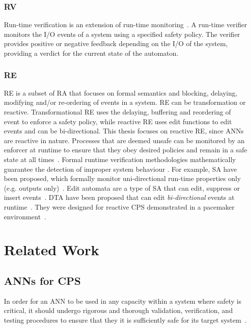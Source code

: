 \subsubsection{\acf{RV}}
Run-time verification is an extension of run-time monitoring~\cite{runtime-verify}.
A run-time verifier monitors the I/O events of a system using a specified safety policy.
The verifier provides positive or negative feedback depending on the I/O of the system, providing a verdict for the current state of the automaton.

\subsubsection{\acf{RE}}
\acf{RE} is a subset of \ac{RA} that focuses on formal semantics and blocking, delaying, modifying and/or re-ordering of events in a system. 
\ac{RE} can be transformation or reactive.
Transformational \ac{RE} uses the delaying, buffering and reordering of event to enforce a safety policy, while reactive \ac{RE} uses edit functions to edit events and can be bi-directional.
This thesis focuses on reactive \ac{RE}, since \acp{ANN} are reactive in nature.
Processes that are deemed unsafe can be monitored by an enforcer at runtime to ensure that they obey desired policies and remain in a safe state at all times~\cite{theoryRE}. 
Formal runtime verification methodologies mathematically guarantee the detection of improper system behaviour \cite{RuntimeAssuranceForComplexCPS}.
For example, \ac{SA} have been proposed, which formally monitor uni-directional run-time properties only (e.g. outputs only)~\cite{enfsafepol}.
Edit automata are a type of \ac{SA} that can edit, suppress or insert events~\cite{editautomata}. 
\ac{DTA} have been proposed that can edit \textit{bi-directional} events at runtime~\cite{recps}. 
They were designed for reactive \ac{CPS} demonstrated in a pacemaker environment~\cite{recps}. 

\section{Related Work}
\subsection{\acfp{ANN} for \acf{CPS}}
In order for an \ac{ANN} to be used in any capacity within a system where safety is critical, it should undergo rigorous and thorough validation, verification, and testing procedures to ensure that they it is sufficiently safe for its target system~\cite{scann, ANNSafetyLifecycle2003}. 


